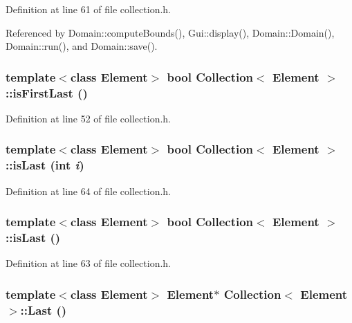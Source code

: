 Definition at line 61 of file collection.h.

Referenced by Domain::computeBounds(), Gui::display(), Domain::Domain(), Domain::run(), and Domain::save().\hypertarget{classCollection_9680a2f3857625a450cbf6eb75d1af90}{
\subsubsection[{isFirstLast}]{\setlength{\rightskip}{0pt plus 5cm}template$<$class Element$>$ bool {\bf Collection}$<$ Element $>$::isFirstLast ()}}
\label{classCollection_9680a2f3857625a450cbf6eb75d1af90}




Definition at line 52 of file collection.h.\hypertarget{classCollection_d38ade90824908e6ad66ed29e48a617d}{
\subsubsection[{isLast}]{\setlength{\rightskip}{0pt plus 5cm}template$<$class Element$>$ bool {\bf Collection}$<$ Element $>$::isLast (int {\em i})}}
\label{classCollection_d38ade90824908e6ad66ed29e48a617d}




Definition at line 64 of file collection.h.\hypertarget{classCollection_d78260d61be71fe6a0f8ccc949e64c97}{
\subsubsection[{isLast}]{\setlength{\rightskip}{0pt plus 5cm}template$<$class Element$>$ bool {\bf Collection}$<$ Element $>$::isLast ()}}
\label{classCollection_d78260d61be71fe6a0f8ccc949e64c97}




Definition at line 63 of file collection.h.\hypertarget{classCollection_4db73392b0ef7120c311226e3061eeb5}{
\subsubsection[{Last}]{\setlength{\rightskip}{0pt plus 5cm}template$<$class Element$>$ Element$\ast$ {\bf Collection}$<$ Element $>$::Last ()}}
\label{classCollection_4db73392b0ef7120c311226e3061eeb5}




